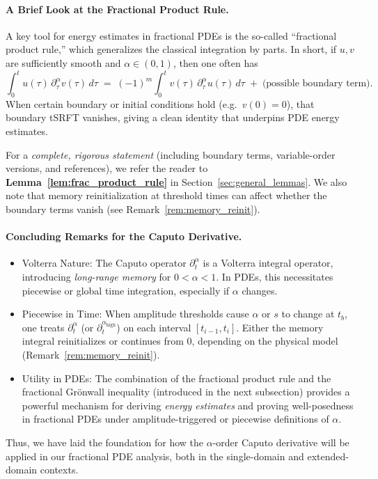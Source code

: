 \documentclass[12pt]{article}
\begin{document}
\paragraph{A Brief Look at the Fractional Product Rule.}
A key tool for energy estimates in fractional PDEs is the so-called 
“fractional product rule,” which generalizes the classical integration by 
parts. In short, if $u,v$ are sufficiently smooth and $\alpha\in(0,1)$, 
then one often has
\[
\int_{0}^{t} u(\tau)\,\partial_\tau^\alpha v(\tau)\,d\tau
\;=\;
(-1)^m \!\int_{0}^{t} v(\tau)\,\partial_\tau^\alpha u(\tau)\,d\tau
\;+\;
\text{(possible boundary term)}.
\]
When certain boundary or initial conditions hold (e.g.\ $v(0)=0$), that boundary 
tSRFT vanishes, giving a clean identity that underpins PDE energy estimates.

For a \emph{complete, rigorous statement} (including boundary terms, variable-order 
versions, and references), we refer the reader to 
\textbf{Lemma~\ref{lem:frac_product_rule}} in Section~\ref{sec:general_lemmas}. 
We also note that memory reinitialization at threshold times can affect whether 
the boundary terms vanish (see Remark~\ref{rem:memory_reinit}). 

\paragraph{Concluding Remarks for the Caputo Derivative.} 
\begin{itemize}
\item{Volterra Nature:} The Caputo operator \(\partial_t^\alpha\) is a Volterra integral
   operator, introducing \emph{long-range memory} for \(0<\alpha<1\). In PDEs, this
   necessitates piecewise or global time integration, especially if \(\alpha\) changes.

\item{Piecewise in Time:} When amplitude thresholds cause \(\alpha\) or \(s\) to change at
   \(t_b\), one treats \(\partial_t^\alpha\) (or \(\partial_t^{\alpha_{\mathrm{high}}}\))
   on each interval \([t_{i-1},t_i]\). Either the memory integral reinitializes or continues
   from 0, depending on the physical model (Remark~\ref{rem:memory_reinit}).

\item{Utility in PDEs:} The combination of the fractional product rule and the fractional
   Grönwall inequality (introduced in the next subsection) provides a powerful mechanism
   for deriving \emph{energy estimates} and proving well-posedness in fractional PDEs under
   amplitude-triggered or piecewise definitions of \(\alpha\).
\end{itemize}
Thus, we have laid the foundation for how the \(\alpha\)-order Caputo derivative will be
applied in our fractional PDE analysis, both in the single-domain and extended-domain
contexts.
\end{document}
